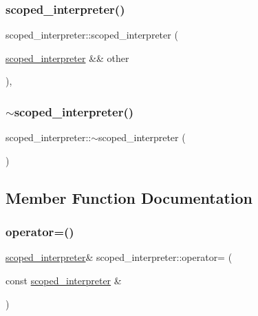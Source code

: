 \mbox{\label{classscoped__interpreter_ac3d62f9f0065b0a627367d88d3ee38e9}} 
\subsubsection{\texorpdfstring{scoped\_interpreter()}{scoped\_interpreter()}\hspace{0.1cm}{\footnotesize\ttfamily [3/3]}}
{\footnotesize\ttfamily scoped\+\_\+interpreter\+::scoped\+\_\+interpreter (\begin{DoxyParamCaption}\item[{\mbox{\hyperlink{classscoped__interpreter}{scoped\+\_\+interpreter}} \&\&}]{other }\end{DoxyParamCaption})\hspace{0.3cm}{\ttfamily [inline]}, {\ttfamily [noexcept]}}

\mbox{\label{classscoped__interpreter_a482334b3d598cfffa28d4efa8a1bb3e9}} 
\subsubsection{\texorpdfstring{$\sim$scoped\_interpreter()}{~scoped\_interpreter()}}
{\footnotesize\ttfamily scoped\+\_\+interpreter\+::$\sim$scoped\+\_\+interpreter (\begin{DoxyParamCaption}{ }\end{DoxyParamCaption})\hspace{0.3cm}{\ttfamily [inline]}}



\subsection{Member Function Documentation}
\mbox{\label{classscoped__interpreter_a7843ed2ad5cf5c54537373c1febec3c7}} 
\subsubsection{\texorpdfstring{operator=()}{operator=()}\hspace{0.1cm}{\footnotesize\ttfamily [1/2]}}
{\footnotesize\ttfamily \mbox{\hyperlink{classscoped__interpreter}{scoped\+\_\+interpreter}}\& scoped\+\_\+interpreter\+::operator= (\begin{DoxyParamCaption}\item[{const \mbox{\hyperlink{classscoped__interpreter}{scoped\+\_\+interpreter}} \&}]{ }\end{DoxyParamCaption})\hspace{0.3cm}{\ttfamily [delete]}}

